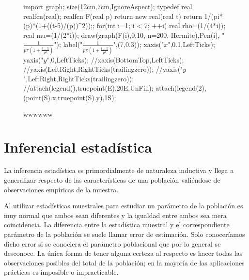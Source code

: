 \documentclass[a4paper]{report}
\begin{document}
\begin{t}
\begin{figure}[!ht]
	\centering	\begin{asy}
		import graph;
		size(12cm,7cm,IgnoreAspect);
		typedef real realfcn(real);
		realfcn F(real p) {
				return new real(real t) {return 1/(pi*(p)*(1+((t-5)/(p))^2));};
			}
		for(int i=1; i < 7; ++i){
				real rho=(1/(4*i));
				real mu=(1/(2*i));
				draw(graph(F(i),0,10, n=200, Hermite),Pen(i),
				"$\frac{1}{p\pi\left(1+\frac{t-5}{p^2}\right)}$");
			}
		label("$\displaystyle\frac{1}{p\pi\left(1+\frac{t-5}{p^2}\right)}$",(7,0.3));
		xaxis("$x$",0.1,LeftTicks);
		yaxis("$y$",0,LeftTicks);
		//xaxis(BottomTop,LeftTicks);
		//yaxis(LeftRight,RightTicks(trailingzero));
		//yaxis("$y$",LeftRight,RightTicks(trailingzero));
		//attach(legend(),truepoint(E),20E,UnFill);
		attach(legend(2),(point(S).x,truepoint(S).y),1S);
	\end{asy}
	\caption{wwwwww}
\end{figure}



























\part{Inferencial estadística}
La inferencia estadística es primordialmente de naturaleza
inductiva y llega a generalizar respecto de las características de
una población valiéndose de observaciones empíricas de la
muestra.

Al utilizar estadísticas muestrales para estudiar un parámetro
de la población es muy normal que ambos sean diferentes y la
igualdad entre ambos sea mera coincidencia. La diferencia
entre la estadística muestral y el correspondiente parámetro
de la población se suele llamar error de estimación. Solo
conoceríamos dicho error si se conociera el parámetro
poblacional que por lo general se desconoce. La única forma
de tener alguna certeza al respecto es hacer todas las
observaciones posibles del total de la población; en la mayoría
de las aplicaciones prácticas es imposible o impracticable.



\end{t}
\end{document}
